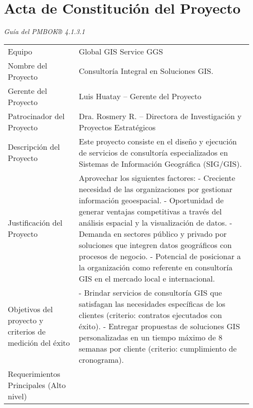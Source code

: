 \section{Acta de Constitución del Proyecto}
\textit{Guía del PMBOK® 4.1.3.1}

\renewcommand{\arraystretch}{1.2}
\setlength{\tabcolsep}{5pt}

\begin{tabular}{|>{\raggedright\arraybackslash}p{4cm}|>{\raggedright\arraybackslash}p{12.2cm}|}
\hline
\multicolumn{1}{|>{\centering\arraybackslash}p{4cm}|}{\textbf{Componente}} & \multicolumn{1}{>{\centering\arraybackslash}p{12.2cm}|}{\textbf{Descripción}} \\
\hline
Equipo & Global GIS Service GGS \\
\hline
Nombre del Proyecto & Consultoría Integral en Soluciones GIS. \\
\hline
Gerente del Proyecto & Luis Huatay – Gerente del Proyecto \\
\hline
Patrocinador del Proyecto & Dra. Rosmery R. – Directora de Investigación y Proyectos Estratégicos \\
\hline
Descripción del Proyecto & Este proyecto consiste en el diseño y ejecución de servicios de consultoría especializados en Sistemas de Información Geográfica (SIG/GIS).\\
\hline
Justificación del Proyecto & Aprovechar los siguientes factores: \newline
- Creciente necesidad de las organizaciones por gestionar información geoespacial. \newline
- Oportunidad de generar ventajas competitivas a través del análisis espacial y la visualización de datos. \newline
- Demanda en sectores público y privado por soluciones que integren datos geográficos con procesos de negocio. \newline
- Potencial de posicionar a la organización como referente en consultoría GIS en el mercado local e internacional. \\
\hline
Objetivos del proyecto y criterios de medición del éxito &
- Brindar servicios de consultoría GIS que satisfagan las necesidades específicas de los clientes (criterio: contratos ejecutados con éxito). \newline
- Entregar propuestas de soluciones GIS personalizadas en un tiempo máximo de 8 semanas por cliente (criterio: cumplimiento de cronograma). \\
\hline
Requerimientos Principales (Alto nivel) & 

\end{tabular}
